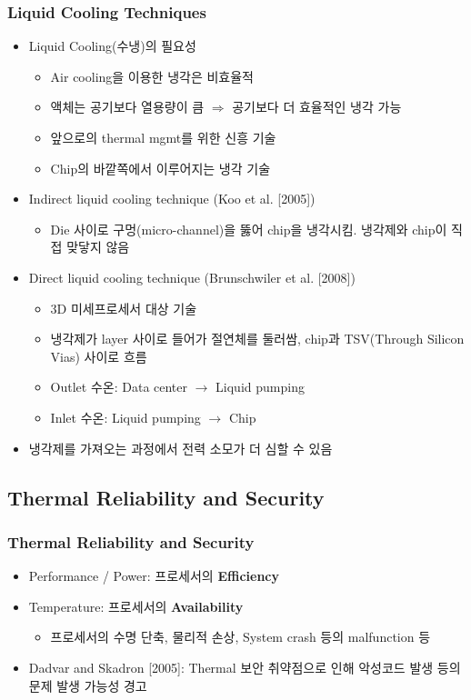 \subsubsection*{Liquid Cooling Techniques}
\begin{itemize}
    \item Liquid Cooling(수냉)의 필요성
    \begin{itemize}
        \item Air cooling을 이용한 냉각은 비효율적
        \item 액체는 공기보다 열용량이 큼 $\Rightarrow$ 공기보다 더 효율적인 냉각 가능
        \item 앞으로의 thermal mgmt를 위한 신흥 기술
        \item Chip의 바깥쪽에서 이루어지는 냉각 기술
    \end{itemize}
    \item Indirect liquid cooling technique (Koo et al. [2005])
    \begin{itemize}
        \item Die 사이로 구멍(micro-channel)을 뚫어 chip을 냉각시킴. 냉각제와 chip이 직접 맞닿지 않음
    \end{itemize}
    \item Direct liquid cooling technique (Brunschwiler et al. [2008])
    \begin{itemize}
        \item 3D 미세프로세서 대상 기술
        \item 냉각제가 layer 사이로 들어가 절연체를 둘러쌈, chip과 TSV(Through Silicon Vias) 사이로 흐름
        \item Outlet 수온: Data center $\rightarrow$ Liquid pumping
        \item Inlet 수온: Liquid pumping $\rightarrow$ Chip
    \end{itemize}
    \item 냉각제를 가져오는 과정에서 전력 소모가 더 심할 수 있음
\end{itemize}

\subsection{Thermal Reliability and Security}

\subsubsection*{Thermal Reliability and Security}
\begin{itemize}
    \item Performance / Power: 프로세서의 \textbf{Efficiency}
    \item Temperature: 프로세서의 \textbf{Availability}
    \begin{itemize}
        \item 프로세서의 수명 단축, 물리적 손상, System crash 등의 malfunction 등
    \end{itemize}
    \item Dadvar and Skadron [2005]: Thermal 보안 취약점으로 인해 악성코드 발생 등의 문제 발생 가능성 경고
\end{itemize}


